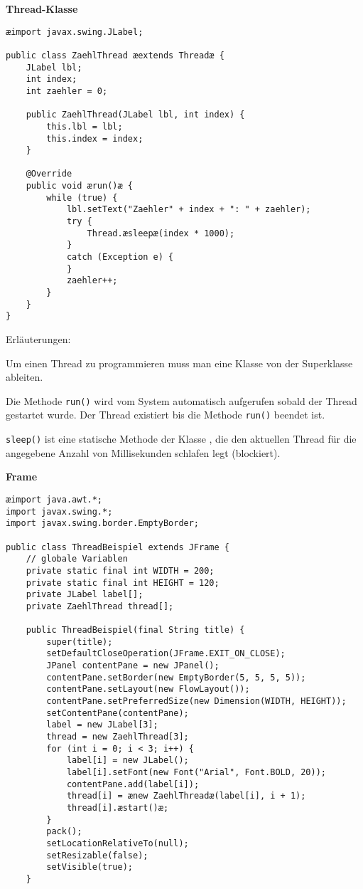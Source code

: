 \begin{compactenum}[a)]
\item \textbf{Thread-Klasse}

\begin{lstlisting}
æimport javax.swing.JLabel;

public class ZaehlThread æextends Threadæ {
    JLabel lbl;
    int index;
    int zaehler = 0;

    public ZaehlThread(JLabel lbl, int index) {
        this.lbl = lbl;
        this.index = index;
    }

    @Override
    public void ærun()æ {
        while (true) {
            lbl.setText("Zaehler" + index + ": " + zaehler);
            try {
                Thread.æsleepæ(index * 1000);
            }
            catch (Exception e) {
            }
            zaehler++;
        }
    }
}
\end{lstlisting}

Erläuterungen:

\begin{compactenum}[1.]
\item Um einen Thread zu programmieren muss man eine Klasse von der Superklasse
 ableiten.
\item Die Methode \lstinline|run()| wird vom System automatisch aufgerufen
sobald der Thread gestartet wurde. Der Thread existiert bis die Methode
\lstinline|run()| beendet ist.
\item \lstinline|sleep()| ist eine statische Methode der Klasse
, die den aktuellen Thread für die angegebene Anzahl von
Millisekunden schlafen legt (blockiert).
\end{compactenum}

\item \textbf{Frame}

\begin{lstlisting}
æimport java.awt.*;
import javax.swing.*;
import javax.swing.border.EmptyBorder;

public class ThreadBeispiel extends JFrame {
    // globale Variablen
    private static final int WIDTH = 200;
    private static final int HEIGHT = 120;
    private JLabel label[];
    private ZaehlThread thread[];

    public ThreadBeispiel(final String title) {
        super(title);
        setDefaultCloseOperation(JFrame.EXIT_ON_CLOSE);
        JPanel contentPane = new JPanel();
        contentPane.setBorder(new EmptyBorder(5, 5, 5, 5));
        contentPane.setLayout(new FlowLayout());
        contentPane.setPreferredSize(new Dimension(WIDTH, HEIGHT));
        setContentPane(contentPane);
        label = new JLabel[3];
        thread = new ZaehlThread[3];
        for (int i = 0; i < 3; i++) {
            label[i] = new JLabel();
            label[i].setFont(new Font("Arial", Font.BOLD, 20));
            contentPane.add(label[i]);
            thread[i] = ænew ZaehlThreadæ(label[i], i + 1);
            thread[i].æstart()æ;
        }
        pack();
        setLocationRelativeTo(null);
        setResizable(false);
        setVisible(true);
    }


\end{lstlisting}
\end{compactenum}
